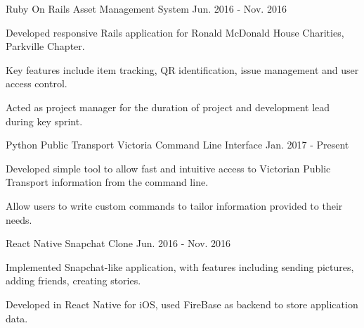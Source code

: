 \begin{cventries}
  \cventry
    {Ruby On Rails}
    {Asset Management System}
    {}
    {Jun. 2016 - Nov. 2016}
    {
      \begin{cvitems}
        \item {Developed responsive Rails application for Ronald McDonald House Charities, Parkville Chapter.}
        \item {Key features include item tracking, QR identification, issue management and user access control.}
        \item {Acted as project manager for the duration of project and development lead during key sprint.}
      \end{cvitems}
    }
  \cventry
    {Python}
    {Public Transport Victoria Command Line Interface}
    {}
    {Jan. 2017 - Present}
    {
      \begin{cvitems}
      	\item {Developed simple tool to allow fast and intuitive access to Victorian Public Transport information from the command line.}
        \item {Allow users to write custom commands to tailor information provided to their needs.}
      \end{cvitems}
    }
   \cventry
    {React Native}
    {Snapchat Clone}
    {}
    {Jun. 2016 - Nov. 2016}
    {
      \begin{cvitems}
      	\item {Implemented Snapchat-like application, with features including sending pictures, adding friends, creating stories.}
      	\item {Developed in React Native for iOS, used FireBase as backend to store application data.}
      \end{cvitems}
    }
\end{cventries}
\vspace{-5mm}
